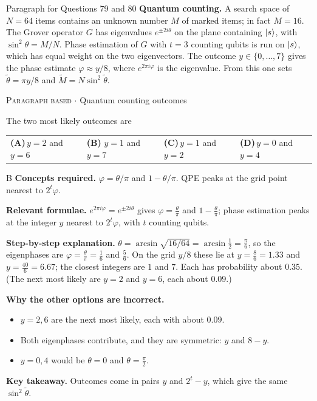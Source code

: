 \documentclass[11pt,a4paper]{article}
\newcommand{\optlabel}[1]{\textbf{(#1)}}
\newcommand{\correctlabel}[1]{\textcolor{okgreen}{\textbf{(#1)}\,\ding{51}}}
\newenvironment{qitem}[1]{\begin{list}{}{\setlength{\leftmargin}{3.3em}\setlength{\labelwidth}{3.1em}%
  \setlength{\labelsep}{0.2em}\setlength{\topsep}{3pt}\setlength{\parsep}{3pt}}\item[\textbf{Q.#1}\hfill]}{\end{list}}
\newcommand{\qsep}{\par\vspace{2pt}{\color{black!15}\hrule}\vspace{4pt}}
\newcommand{\qmeta}[2]{{\footnotesize\color{black!60}\textsc{#1} \;$\cdot$\; #2}\par}
\begin{document}
\begin{passagebox}{Paragraph for Questions 79 and 80}
\textbf{Quantum counting.} A search space of $N = 64$ items contains an unknown number $M$ of marked items; in fact $M = 16$. The Grover operator $G$ has
eigenvalues $e^{\pm 2i\theta}$ on the plane containing $\ket{s}$, with $\sin^2\theta = M/N$. Phase estimation of $G$ with $t = 3$ counting qubits is run on $\ket{s}$, which has equal weight on the two eigenvectors. The outcome $y \in \{0, \dots, 7\}$ gives the
phase estimate $\varphi \approx y/8$, where $e^{2\pi i\varphi}$ is the eigenvalue. From this one sets $\tilde\theta = \pi y/8$ and $\tilde M = N\sin^2\tilde\theta$.
\end{passagebox}
\begin{qitem}{79}
\qmeta{Paragraph based}{Quantum counting outcomes}
The two most likely outcomes are
\par\smallskip\noindent\begin{tabularx}{\linewidth}{@{}*{4}{L}@{}}
\optlabel{A}\,$y = 2$ and $y = 6$ & \correctlabel{B}\,$y = 1$ and $y = 7$ & \optlabel{C}\,$y = 1$ and $y = 2$ & \optlabel{D}\,$y = 0$ and $y = 4$
\end{tabularx}
\end{qitem}
\begin{solbox}{B}
\textbf{\color{brand}Concepts required.} $\varphi = \theta/\pi$ and $1 - \theta/\pi$. QPE peaks at the grid point nearest to $2^t\varphi$.

\textbf{\color{brand}Relevant formulae.} $e^{2\pi i\varphi} = e^{\pm2i\theta}$ gives $\varphi = \frac\theta\pi$ and $1 - \frac\theta\pi$; phase estimation peaks at the integer $y$ nearest to $2^t\varphi$, with $t$ counting qubits.

\textbf{\color{brand}Step-by-step explanation.} $\theta = \arcsin\sqrt{16/64} = \arcsin\frac12 = \frac\pi6$, so the eigenphases are $\varphi = \frac{\theta}{\pi} = \frac16$ and $\frac56$. On the grid $y/8$ these lie at $y = \frac86 = 1.33$ and $y = \frac{40}{6} = 6.67$; the closest integers are $1$ and $7$.
Each has probability about $0.35$. (The next most likely are $y = 2$ and $y = 6$, each about $0.09$.)

\textbf{\color{brand}Why the other options are incorrect.}
\begin{itemize}[leftmargin=2.4em, itemsep=1pt, topsep=2pt]
\item[\textbf{(A)}] $y = 2, 6$ are the next most likely, each with about $0.09$.
\item[\textbf{(C)}] Both eigenphases contribute, and they are symmetric: $y$ and $8 - y$.
\item[\textbf{(D)}] $y = 0, 4$ would be $\theta = 0$ and $\theta = \frac\pi2$.
\end{itemize}
\textbf{\color{brand}Key takeaway.} Outcomes come in pairs $y$ and $2^t - y$, which give the same $\sin^2\tilde\theta$.
\end{solbox}
\qsep
\end{document}
